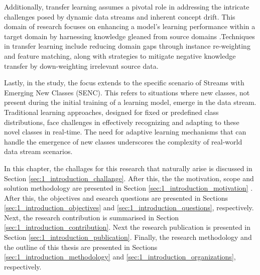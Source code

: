 Additionally, transfer learning assumes a pivotal role in addressing the intricate challenges posed by dynamic data streams and inherent concept drift. This domain of research focuses on enhancing a model's learning performance within a target domain by harnessing knowledge gleaned from source domains \cite{pan2009survey} \cite{wang2018systematic}.Techniques in transfer learning include reducing domain gaps through instance re-weighting and feature matching, along with strategies to mitigate negative knowledge transfer by down-weighting irrelevant source data.

Lastly, in the study, the focus extends to the specific scenario of Streams with Emerging New Classes (SENC). This refers to situations where new classes, not present during the initial training of a learning model, emerge in the data stream. Traditional learning approaches, designed for fixed or predefined class distributions, face challenges in effectively recognizing and adapting to these novel classes in real-time. The need for adaptive learning mechanisms that can handle the emergence of new classes underscores the complexity of real-world data stream scenarios.
     

In this chapter, the challages for this research 
that naturally arise is discussed in  Section \ref{sec:1_introduction_challange}. After this, the the motivation, scope and solution methodology are presented in Section \ref{sec:1_introduction_motivation} . After this, the objectives and
esearch questions are presented in Sections \ref{sec:1_introduction_objectives} and \ref{sec:1_introduction_questions}, respectively. Next, the
research contribution is summarised in Section \ref{sec:1_introduction_contribution}. Next the research publication is presented in Section \ref{sec:1_introduction_publication}. Finally,
the research methodology and the outline of this thesis are presented in Sections \ref{sec:1_introduction_methodology} and
\ref{sec:1_introduction_organizations}, respectively.
